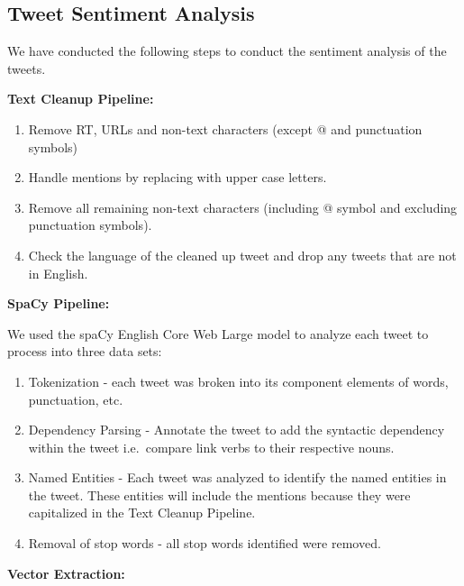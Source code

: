 \documentclass[12pt,oneside]{chicagocapstone}
\begin{document}
\subsection*{Tweet Sentiment Analysis}\label{tweet-sentiment-analysis}

We have conducted the following steps to conduct the sentiment analysis
of the tweets.

\textbf{Text Cleanup Pipeline:}
\begin{enumerate}
\def\labelenumi{\arabic{enumi}.}
\item
  Remove RT, URLs and non-text characters (except @ and punctuation
  symbols)
\item
  Handle mentions by replacing with upper case letters.
\item
  Remove all remaining non-text characters (including @ symbol and
  excluding punctuation symbols).
\item
  Check the language of the cleaned up tweet and drop any tweets that
  are not in English.
\end{enumerate}
\textbf{SpaCy Pipeline:}

We used the spaCy English Core Web Large model to analyze each tweet to
process into three data sets:
\begin{enumerate}
\def\labelenumi{\arabic{enumi}.}
\item
  Tokenization - each tweet was broken into its component elements of
  words, punctuation, etc.
\item
  Dependency Parsing - Annotate the tweet to add the syntactic
  dependency within the tweet i.e.~compare link verbs to their
  respective nouns.
\item
  Named Entities - Each tweet was analyzed to identify the named
  entities in the tweet. These entities will include the mentions
  because they were capitalized in the Text Cleanup Pipeline.
\item
  Removal of stop words - all stop words identified were removed.
\end{enumerate}
\textbf{Vector Extraction:}
\end{document}
